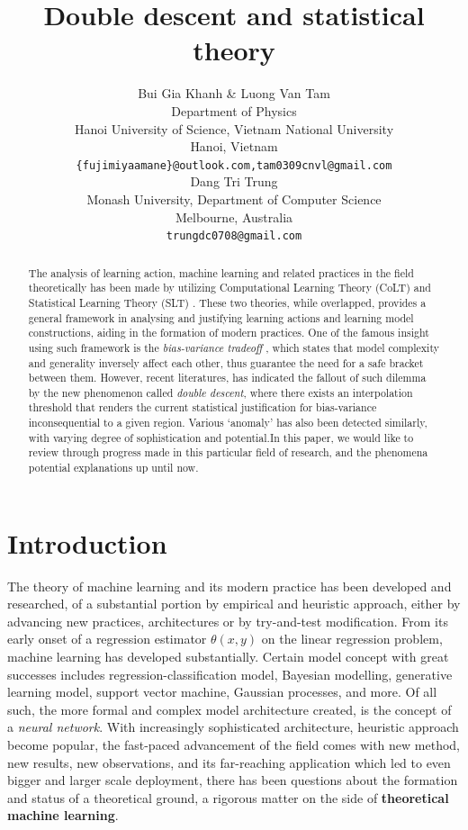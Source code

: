 \documentclass[10pt]{article} %
\title{Double descent and statistical theory}
\author{Bui Gia Khanh  \& Luong Van Tam\\
Department of Physics\\
Hanoi University of Science, Vietnam National University\\
Hanoi, Vietnam\\
\texttt{\{fujimiyaamane\}@outlook.com,tam0309cnvl@gmail.com} \\
\AND 
Dang Tri Trung \\
Monash University, Department of Computer Science \\
Melbourne, Australia\\
\texttt{trungdc0708@gmail.com}
}
\begin{document}
\maketitle

\begin{abstract}
       The analysis of learning action, machine learning and related practices in the field theoretically has been made by utilizing Computational Learning Theory (CoLT) \cite{10.1145/1968.1972} and Statistical Learning Theory (SLT) \cite{Vapnik1999-VAPTNO}. These two theories, while overlapped, provides a general framework in analysing and justifying learning actions and learning model constructions, aiding in the formation of modern practices. One of the famous insight using such framework is the \textit{bias-variance tradeoff} \cite{6797087}, which states that model complexity and generality inversely affect each other, thus guarantee the need for a safe bracket between them. However, recent literatures, \cite{belkin_reconciling_2019} has indicated the fallout of such dilemma by the new phenomenon called \textit{double descent}, where there exists an interpolation threshold that renders the current statistical justification for bias-variance inconsequential to a given region. Various `anomaly' has also been detected similarly, with varying degree of sophistication and potential.In this paper, we would like to review through progress made in this particular field of research, and the phenomena potential explanations up until now. 
\end{abstract}

\section{Introduction}

The theory of machine learning and its modern practice has been developed and researched, of a substantial portion by empirical and heuristic approach, either by advancing new practices, architectures or by try-and-test modification. From its early onset of a regression estimator $\theta(x,y)$ on the linear regression problem, machine learning has developed substantially. Certain model concept with great successes includes regression-classification model, Bayesian modelling, generative learning model, support vector machine, Gaussian processes, and more. Of all such, the more formal and complex model architecture created, is the concept of a \textit{neural network}. With increasingly sophisticated architecture, heuristic approach become popular, the fast-paced advancement of the field comes with new method, new results, new observations, and its far-reaching application which led to even bigger and larger scale deployment, there has been questions about the formation and status of a theoretical ground, a rigorous matter on the side of \textbf{theoretical machine learning}.
\end{document}
